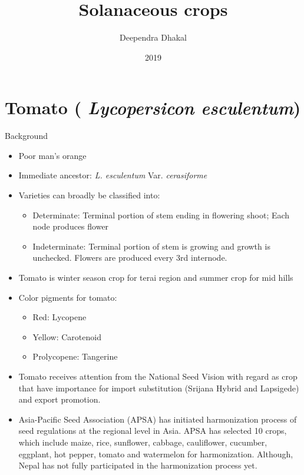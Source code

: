 \documentclass[
  ignorenonframetext,
  aspectratio=169]{beamer}
\title{Solanaceous crops}
\author{Deependra Dhakal}
\date{2019}
\providecommand{\tightlist}{%
  \setlength{\itemsep}{0pt}\setlength{\parskip}{0pt}}
\begin{document}
\frame{\titlepage}

\begin{frame}[allowframebreaks]
  \tableofcontents[hideallsubsections]
\end{frame}
\hypertarget{tomato-lycopersicon-esculentum}{%
\section{\texorpdfstring{Tomato ( \emph{Lycopersicon
esculentum})}{Tomato ( Lycopersicon esculentum)}}\label{tomato-lycopersicon-esculentum}}

\begin{frame}{Background}
\protect\hypertarget{background}{}
\begin{itemize}
\tightlist
\item
  Poor man's orange
\item
  Immediate ancestor: \emph{L. esculentum} Var. \emph{cerasiforme}
\item
  Varieties can broadly be classified into:

  \begin{itemize}
  \tightlist
  \item
    Determinate: Terminal portion of stem ending in flowering shoot;
    Each node produces flower
  \item
    Indeterminate: Terminal portion of stem is growing and growth is
    unchecked. Flowers are produced every 3rd internode.
  \end{itemize}
\item
  Tomato is winter season crop for terai region and summer crop for mid
  hills
\item
  Color pigments for tomato:

  \begin{itemize}
  \tightlist
  \item
    Red: Lycopene
  \item
    Yellow: Carotenoid
  \item
    Prolycopene: Tangerine
  \end{itemize}
\end{itemize}
\end{frame}

\begin{frame}{}
\protect\hypertarget{section}{}
\begin{itemize}
\tightlist
\item
  Tomato receives attention from the National Seed Vision with regard as
  crop that have importance for import substitution (Srijana Hybrid and
  Lapsigede) and export promotion.
\item
  Asia-Pacific Seed Association (APSA) has initiated harmonization
  process of seed regulations at the regional level in Asia. APSA has
  selected 10 crops, which include maize, rice, sunflower, cabbage,
  cauliflower, cucumber, eggplant, hot pepper, tomato and watermelon for
  harmonization. Although, Nepal has not fully participated in the
  harmonization process yet.
\end{itemize}
\end{frame}
\end{document}
